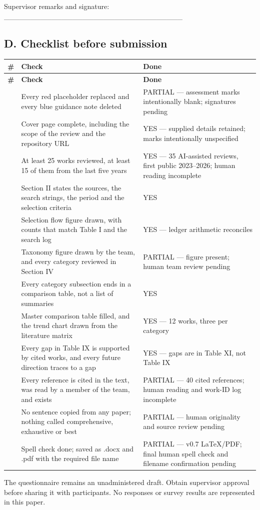 Supervisor remarks and signature: \_\_\_\_\_\_\_\_\_\_\_\_\_\_\_\_\_\_\_\_\_\_\_\_\_\_\_\_\_\_\_\_\_\_
\subsection*{D. Checklist before submission}
\begingroup
\fontsize{9}{10.5}\selectfont
\setlength{\tabcolsep}{1.4mm}
\renewcommand{\arraystretch}{1.08}
\begin{longtable}{|>{\raggedright\arraybackslash}p{6.44mm}|>{\raggedright\arraybackslash}p{99.82mm}|>{\raggedright\arraybackslash}p{54.74mm}|}
\hline
\rowcolor{navy}\color{white}\bfseries \# & \color{white}\bfseries Check & \color{white}\bfseries Done\\\hline
\endfirsthead
\hline
\rowcolor{navy}\color{white}\bfseries \# & \color{white}\bfseries Check & \color{white}\bfseries Done\\\hline
\endhead
\endfoot
\endlastfoot
1 & Every red placeholder replaced and every blue guidance note deleted & PARTIAL — assessment marks intentionally blank; signatures pending\\\hline
2 & Cover page complete, including the scope of the review and the repository URL & YES — supplied details retained; marks intentionally unspecified\\\hline
3 & At least 25 works reviewed, at least 15 of them from the last five years & YES — 35 AI-assisted reviews, first public 2023–2026; human reading incomplete\\\hline
4 & Section II states the sources, the search strings, the period and the selection criteria & YES\\\hline
5 & Selection flow figure drawn, with counts that match Table I and the search log & YES — ledger arithmetic reconciles\\\hline
6 & Taxonomy figure drawn by the team, and every category reviewed in Section IV & PARTIAL — figure present; human team review pending\\\hline
7 & Every category subsection ends in a comparison table, not a list of summaries & YES\\\hline
8 & Master comparison table filled, and the trend chart drawn from the literature matrix & YES — 12 works, three per category\\\hline
9 & Every gap in Table IX is supported by cited works, and every future direction traces to a gap & YES — gaps are in Table XI, not Table IX\\\hline
10 & Every reference is cited in the text, was read by a member of the team, and exists & PARTIAL — 40 cited references; human reading and work-ID log incomplete\\\hline
11 & No sentence copied from any paper; nothing called comprehensive, exhaustive or best & PARTIAL — human originality and source review pending\\\hline
12 & Spell check done; saved as .docx and .pdf with the required file name & PARTIAL — v0.7 LaTeX/PDF; final human spell check and filename confirmation pending\\\hline
\end{longtable}
\endgroup

The questionnaire remains an unadministered draft. Obtain supervisor approval before sharing it with participants. No responses or survey results are represented in this paper.